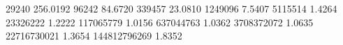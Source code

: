 29240        256.0192
96242        84.6720
339457       23.0810
1249096      7.5407
5115514      1.4264
23326222     1.2222
117065779    1.0156
637044763    1.0362
3708372072   1.0635
22716730021  1.3654
144812796269 1.8352